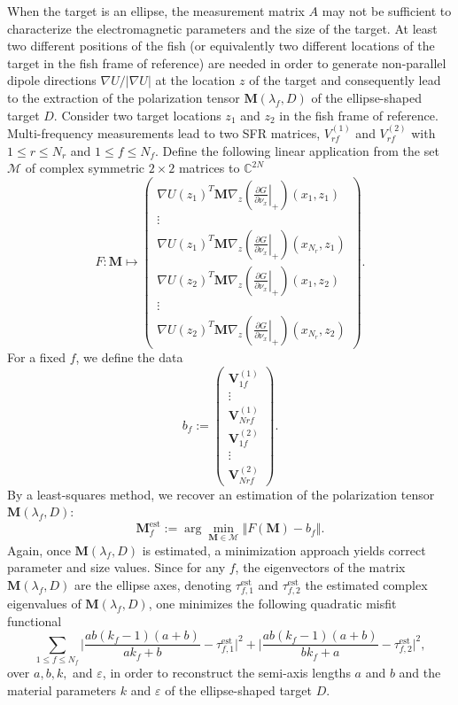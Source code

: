 When the target is an ellipse, the measurement matrix $A$ may not
be sufficient to characterize the electromagnetic parameters and
the size of the target. At least two different positions of the
fish (or equivalently two different locations of the target in the
fish frame of reference) are needed in order to generate
non-parallel dipole directions $\nabla U/|\nabla U|$ at the
location $z$ of the target and consequently lead to the extraction
of the polarization tensor $\mathbf{M}(\lambda_f, D)$ of the ellipse-shaped
target $D$. Consider two target locations $z_{1}$ and $z_{2}$ in
the fish frame of reference. Multi-frequency measurements lead to
two SFR matrices, $V_{rf}^{(1)}$ and $V_{rf}^{(2)}$ with $1\leq
r\leq N_r$ and $1\leq f\leq N_f$. Define the following linear
application from the set $\mathcal{M}$ of complex symmetric
$2\times 2$ matrices to $\mathbb{C}^{2N}$
\[
F: \mathbf{M} \mapsto\left(\begin{array}{c} \nabla
U(z_{1})^T  \mathbf{M}  \nabla_{z}\left(\left.\frac{\partial G}{\partial\nu_{x}}\right|_{+}\right)(x_{1},z_{1})\\
\vdots\\
\nabla U(z_{1})^T \mathbf{M}  \nabla_{z}\left(\left.\frac{\partial G}{\partial\nu_{x}}\right|_{+}\right)(x_{N_r},z_{1})\\
\nabla U(z_{2})^T \mathbf{M} \nabla_{z}\left(\left.\frac{\partial G}{\partial\nu_{x}}\right|_{+}\right)(x_{1},z_{2})\\
\vdots\\
\nabla U(z_{2})^T \mathbf{M} \nabla_{z}\left(\left.\frac{\partial
G}{\partial\nu_{x}}\right|_{+}\right)(x_{N_r},z_{2})
\end{array}\right)
.
\]
For a fixed $f$, we define the data
\[
b_{f}:=\left(\begin{array}{c}
\mathbf{V}_{1 f}^{(1)}\\
\vdots\\
\mathbf{V}_{Nr f}^{(1)}\\
\mathbf{V}_{1 f}^{(2)}\\
\vdots\\
\mathbf{V}_{Nr f}^{(2)}
\end{array}\right).
\]
By a least-squares method, we recover an estimation of the
polarization tensor $\mathbf{M}(\lambda_f,D)$:
\[
\mathbf{M}_{f}^{{\textrm{est}}}:=\arg\min_{\mathbf{M} \in \mathcal{M}}\left\Vert F(\mathbf{M})
-b_{f}\right\Vert .
\]
Again, once $\mathbf{M}(\lambda_f,D)$ is estimated, a minimization approach
yields correct parameter and size values. Since for any $f$, the
eigenvectors of the matrix $\mathbf{M}(\lambda_f,D)$ are the ellipse axes,
denoting $\tau_{f,1}^{\mbox {est}}$ and $\tau_{f,2}^{\mbox {est}}$
the estimated complex eigenvalues of $\mathbf{M}(\lambda_f,D)$, one minimizes the
following quadratic misfit functional
$$
\sum_{1\leq f\leq N_f} \bigg| \frac{a b (k_f-1) (a+b)}{a k_f+b} -
\tau_{f,1}^{\mbox {est}} \bigg|^2 + \bigg| \frac{a b (k_f-1)
(a+b)}{b k_f+a} - \tau_{f,2}^{\mbox {est}} \bigg|^2,
$$
over $a, b, k,$ and  $\varepsilon$, in order to reconstruct the
semi-axis lengths $a$ and $b$ and the material parameters $k$ and
$\varepsilon$ of the ellipse-shaped target $D$.


